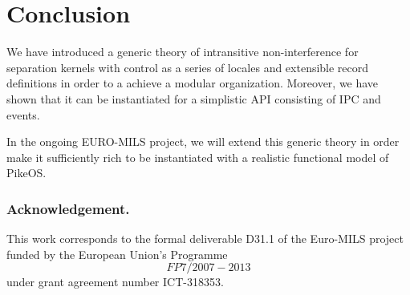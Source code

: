 \documentclass[11pt,a4paper]{article}
\begin{document}

\section{Conclusion}

We have introduced a generic theory of intransitive non-interference for separation 
kernels with control as a series of locales and extensible record definitions in order
to a achieve a modular organization.
Moreover, we have shown that it can be instantiated for a simplistic API consisting of IPC 
and events.

In the ongoing EURO-MILS project, we will extend this generic theory in order make it
sufficiently rich to be instantiated with a realistic functional model of PikeOS.

\subsubsection{Acknowledgement.}This work corresponds to the formal deliverable D31.1 
of the Euro-MILS project funded  by the European Union's Programme \[FP7/2007-2013\] 
under grant agreement number ICT-318353.



\end{document}
